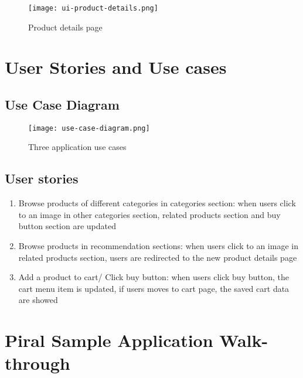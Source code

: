 \documentclass[a4paper]{book}
\begin{document}


\begin{figure}[h!]
    \centering
    \captionsetup{justification=centering}
    \texttt{[image: ui-product-details.png]}
    \caption{Product details page}
    \label{fig:ui-product-details}
\end{figure}

\section{User Stories and Use cases} \label{User Stories and Use cases}

\subsection{Use Case Diagram}
\begin{figure}[ht]
  \centering
  \captionsetup{justification=centering}
  \texttt{[image: use-case-diagram.png]}
  \caption{Three application use cases}
  \label{fig:use-case-diagram}
\end{figure}

\subsection{User stories}

\begin{enumerate}
    \item Browse products of different categories in categories section: when users click to an image in other categories section, related products section and buy button section are updated
    \item Browse products in recommendation sections: when users click to an image in related products section, users are redirected to the new product details page
    \item Add a product to cart/ Click buy button: when users click buy button, the cart menu item is updated, if users moves to cart page, the saved cart data are showed
\end{enumerate}

\section{Piral Sample Application Walk-through} \label{Piral Application}
\end{document}
